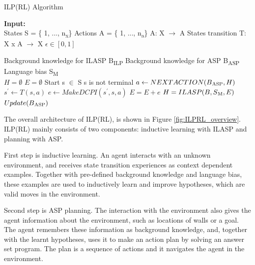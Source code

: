 \begin{algorithm}
\caption{ILP(RL) Algorithm}\label{euclid}
\begin{algorithmic}[1]
\State \textbf{Input:} \\
\State States S = \{ 1, ..., n\textsubscript{x}\}
\State Actions A = \{ 1, ..., n\textsubscript{a}\} A: X $\rightarrow$ A
\State States transition T: X x A $\rightarrow$ X
\State $\epsilon \in [0,1]$

\State Background knowledge for ILASP B\textsubscript{ILP}
\State Background knowledge for ASP B\textsubscript{ASP}
\State Language bias S\textsubscript{M} \\

\State $H = \emptyset$
\State $E = \emptyset$
\State Start s $\in$ S
\While s is not terminal 
\State $a \leftarrow NEXTACTION(B\textsubscript{ASP}, H)$
\State $s^\prime \leftarrow T(s,a)$
\State $e \leftarrow MakeDCPI(s^\prime, s, a) $ 
\State $E = E + e$
\State $H = ILASP(B, S\textsubscript{M}, E)$
\EndIf
\State $Update(B\textsubscript{ASP})$
\EndWhile
\EndProcedure
\end{algorithmic}
\end{algorithm}
    

The overall architecture of ILP(RL), is shown in Figure \ref{fig:ILPRL_overview}. 
ILP(RL) mainly consists of two components: inductive learning with ILASP and planning with ASP. 

First step is inductive learning. An agent interacts with an unknown environment, 
and receives state transition experiences as context dependent examples. 
Together with pre-defined background knowledge and language bias, these examples are used to inductively learn and improve hypotheses, which are valid moves in the environment.

Second step is ASP planning. The interaction with the environment also gives the agent information about the environment, such as locations of walls or a goal. 
The agent remembers these information as background knowledge, and, 
together with the learnt hypotheses, uses it to make an action plan by solving an answer set program.
The plan is a sequence of actions and it navigates the agent in the environment.

